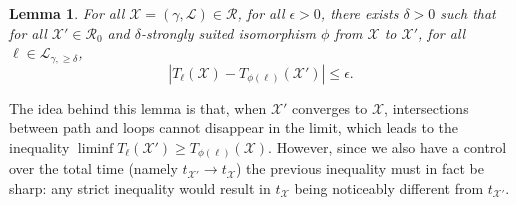 \documentclass[11pt]{article}
\newtheorem{lemma}[theorem]{Lemma}
\def\cX{{\mathcal X}}
\def\Conf{{\mathscr{R}}}
\begin{document}
\begin{lemma}
\label{le:Tcont}
  For all $\mathcal{X}=(\gamma,\mathcal{L})\in \Conf$, for all $\epsilon>0$, there exists $\delta>0$ such that for all
  $\mathcal{X}'\in \Conf_0$ and $\delta$-strongly suited isomorphism $\phi$ from $\mathcal{X}$ to $\mathcal{X}'$,
  for all $\ell\in \mathcal{L}_{\gamma,\geq \delta}$,
  \[|T_\ell(\mathcal{X})-T_{\phi(\ell)}(\mathcal{X}')|\leq \epsilon. \]
\end{lemma}
The idea behind this lemma is that,
when $\mathcal{X}'$ converges to $\mathcal{X}$, intersections between path and loops cannot disappear in the limit, which leads to the inequality $\liminf T_{\ell}(\mathcal{X}')\geq T_{\phi(\ell)}(\mathcal{X})$. However, since we also have a control over the total time (namely $t_{\cX'} \to t_{\cX}$) the previous inequality must in fact be sharp: any strict inequality would result in $t_{\cX}$ being noticeably different from $t_{\cX'}$. 
\end{document}
